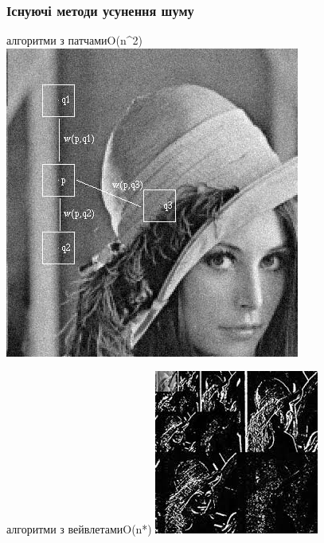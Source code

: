 \documentclass[12pt]{beamer}
\begin{document}
\begin{frame}\frametitle{Існуючі методи усунення шуму}	
	\begin{multicols}{2}
		алгоритми з патчами\linebreak O(n^{2}) \linebreak
		\includegraphics[scale=0.35]{images/patch}
		
		\columnbreak
		
		алгоритми з вейвлетами\linebreak O(n*) \linebreak
		\includegraphics[scale=0.65]{images/dwt}
	\end{multicols}
	
\end{frame}
\end{document}
